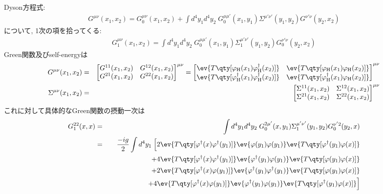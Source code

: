 \documentclass[10.5pt,a4paper]{jreport}
\begin{document}
Dyson方程式:
\begin{eqnarray}
  G^{\mu\nu}(x_1, x_2) = G_0^{\mu\nu}(x_1, x_2) + \int d^4y_1d^4y_2\;G_0^{\mu\mu'}(x_1, y_1)\Sigma^{\mu'\nu'}(y_1, y_2)G^{\nu'\nu}(y_2, x_2)
\end{eqnarray}
について, 1次の項を拾ってくる:
\begin{eqnarray}
  G^{\mu\nu}_1(x_1, x_2) =  \int d^4y_1d^4y_2\;G_0^{\mu\mu'}(x_1, y_1)\Sigma_1^{\mu'\nu'}(y_1, y_2)G_0^{\nu'\nu}(y_2, x_2)
\end{eqnarray}
Green関数及びself-energyは
\begin{eqnarray}
  G^{\mu\nu}(x_1, x_2) &=&
  \begin{bmatrix}
    G^{11}(x_1, x_2)&G^{12}(x_1, x_2)\\
    G^{21}(x_1, x_2)&G^{22}(x_1, x_2)
  \end{bmatrix}^{\mu\nu} =
  \begin{bmatrix}
    \ev{T\qty[\varphi_{\rm H}(x_1)\varphi_{\rm H}^\dagger(x_2)]}&\ev{T\qty[\varphi_{\rm H}(x_1)\varphi_{\rm H}(x_2)]}\\
    \ev{T\qty[\varphi_{\rm H}^\dagger(x_1)\varphi_{\rm H}^\dagger(x_2)]}&\ev{T\qty[\varphi_{\rm H}^\dagger(x_1)\varphi_{\rm H}(x_2)]}
  \end{bmatrix}^{\mu\nu}\\
  \Sigma^{\mu\nu}(x_1, x_2) &=&
  \begin{bmatrix}
    \Sigma^{11}(x_1, x_2)&\Sigma^{12}(x_1, x_2)\\
    \Sigma^{21}(x_1, x_2)&\Sigma^{22}(x_1, x_2)
  \end{bmatrix}^{\mu\nu}
\end{eqnarray}
これに対して具体的なGreen関数の摂動一次は
\begin{eqnarray}
  \nonumber  G^{22}_1(x, x) &=& \int d^4y_1d^4y_2\;G_0^{2\mu'}(x, y_1)\Sigma_1^{\mu'\nu'}(y_1, y_2)G_0^{\nu'2}(y_2, x)\\
\nonumber  &=& \frac{-ig}{2}\int d^4y_1\; \Bigl[2\ev{T\qty[\varphi^\dagger(x)\varphi^\dagger(y_1)]}\ev{\varphi(y_1)\varphi(y_1)}\ev{T\qty[\varphi^\dagger(y_1)\varphi(x)]}\\
\nonumber    &&\hspace{2cm}+4\ev{T\qty[\varphi^\dagger(x)\varphi^\dagger(y_1)]}\ev{\varphi^\dagger(y_1)\varphi(y_1)}\ev{T\qty[\varphi(y_1)\varphi(x)]}\\
&&\hspace{2cm}+2\ev{T\qty[\varphi^\dagger(x)\varphi(y_1)]}\ev{\varphi^\dagger(y_1)\varphi^\dagger(y_1)}\ev{T\qty[\varphi(y_1)\varphi(x)]}\\
&&\hspace{2cm}+ 4\ev{T\qty[\varphi^\dagger(x)\varphi(y_1)]}\ev{\varphi^\dagger(y_1)\varphi(y_1)}\ev{T\qty[\varphi^\dagger(y_1)\varphi(x)]}
\Bigr]
\end{eqnarray}
\end{document}
